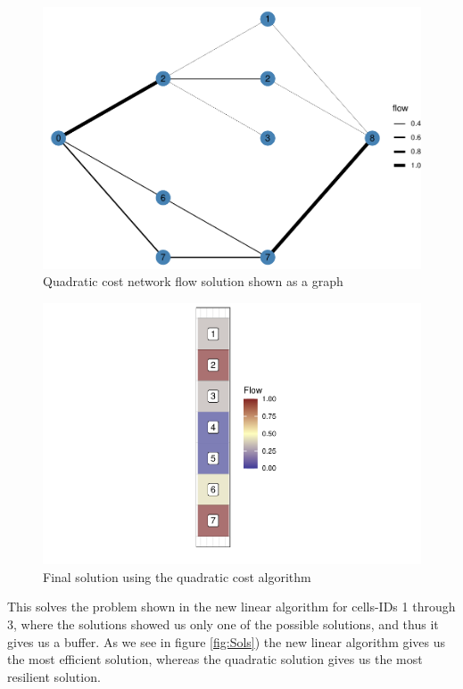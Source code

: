 \documentclass[]{article}
\begin{document}
\begin{figure}
\centering
\includegraphics{TagetBasedNew_files/figure-latex/QuadGraphNEt-1.pdf}
\caption{\label{fig:QuadGraphNEt}Quadratic cost network flow solution shown as a graph}
\end{figure}

\begin{figure}
\centering
\includegraphics{TagetBasedNew_files/figure-latex/FinalSolutionQuad-1.pdf}
\caption{\label{fig:FinalSolutionQuad}Final solution using the quadratic cost algorithm}
\end{figure}

This solves the problem shown in the new linear algorithm for cells-IDs 1 through 3, where the solutions showed us only one of the possible solutions, and thus it gives us a buffer. As we see in figure \ref{fig:Sols}) the new linear algorithm gives us the most efficient solution, whereas the quadratic solution gives us the most resilient solution.
\end{document}
